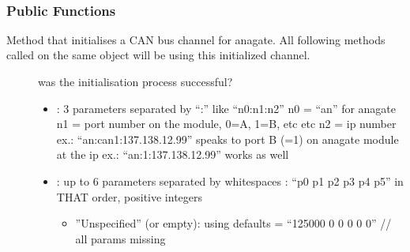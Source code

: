 \documentclass[letterpaper,10pt,english]{sphinxmanual}
\begin{document}
\begin{fulllineitems}
\label{\detokenize{vendors/anagate:_CPPv410AnaCanScan}}%
\pysigstartmultiline
{}\label{\detokenize{vendors/anagate:classAnaCanScan}}%
\pysigstopmultiline~\subsubsection*{Public Functions}

\begin{fulllineitems}
\label{\detokenize{vendors/anagate:_CPPv4N10AnaCanScan9createBusEK6stringK6string}}%
\pysigstartmultiline
{}\label{\detokenize{vendors/anagate:classAnaCanScan_1a54a66154c956b4605ff18f93f552db60}}%
\pysigstopmultiline
Method that initialises a CAN bus channel for anagate. All following methods called on the same object will be using this initialized channel.

\begin{description}
\item[{}] \leavevmode
was the initialisation process successful? 

\item[{}] \leavevmode\begin{itemize}
\item {} 
: 3 parameters separated by “:” like “n0:n1:n2” n0 = “an” for anagate n1 = port number on the module, 0=A, 1=B, etc etc n2 = ip number ex.: “an:can1:137.138.12.99” speaks to port B (=1) on anagate module at the ip ex.: “an:1:137.138.12.99” works as well

\item {} 
: up to 6 parameters separated by whitespaces : “p0 p1 p2 p3 p4 p5” in THAT order, positive integers\begin{itemize}
\item {} 
”Unspecified” (or empty): using defaults = “125000 0 0 0 0 0” // all params missing


\end{itemize}
\end{itemize}
\end{description}
\end{fulllineitems}
\end{fulllineitems}
\end{document}
